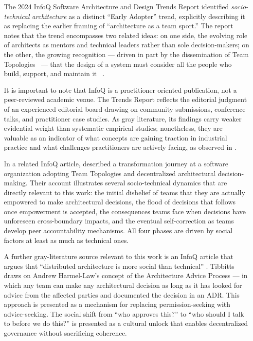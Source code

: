 The 2024 InfoQ Software Architecture and Design Trends Report \citep{infoq2024trends} identified \emph{socio-technical architecture} as a distinct ``Early Adopter'' trend,
explicitly describing it as replacing the earlier framing of ``architecture as a team
sport.'' The report notes that the trend encompasses two related ideas: on one side,
the evolving role of architects as mentors and technical leaders rather than sole
decision-makers; on the other, the growing recognition --- driven in part by the
dissemination of Team Topologies~\citep{skelton2019} --- that the design of a system
must consider all the people who build, support, and maintain it ~\citep{infoq2024trends}.

It is important to note that InfoQ is a practitioner-oriented publication, not a
peer-reviewed academic venue. The Trends Report reflects the editorial judgment of an
experienced editorial board drawing on community submissions, conference talks, and
practitioner case studies. As gray literature, its findings carry weaker evidential
weight than systematic empirical studies; nonetheless, they are valuable as an indicator
of what concepts are gaining traction in industrial practice and what challenges
practitioners are actively facing, as observed in \citet{infoq2024trends}.

In a related InfoQ article, \citet{infoq2025empowering} described
a transformation journey at a software organization adopting Team Topologies and
decentralized architectural decision-making. Their account illustrates several
socio-technical dynamics that are directly relevant to this work: the initial disbelief
of teams that they are actually empowered to make architectural decisions, the flood of
decisions that follows once empowerment is accepted, the consequences teams face when
decisions have unforeseen cross-boundary impacts, and the eventual self-correction as
teams develop peer accountability mechanisms. All four phases are driven by social
factors at least as much as technical ones.

A further gray-literature source relevant to this work is an InfoQ article that argues that ``distributed architecture is
more social than technical'' \citep{infoq2025decentralized}. Tibbitts draws on Andrew Harmel-Law's concept of the
Architecture Advice Process --- in which any team can make
any architectural decision as long as it has looked for advice from the affected parties and
documented the decision in an ADR. This approach is presented as a mechanism for replacing permission-seeking
with advice-seeking. The social shift from ``who approves this?'' to ``who should I talk
to before we do this?'' is presented as a cultural unlock that enables decentralized
governance without sacrificing coherence.

